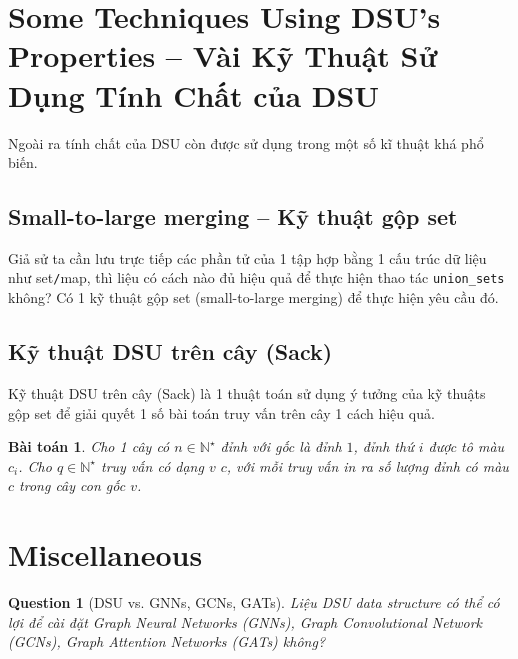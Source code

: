 \documentclass{article}
\newtheorem{baitoan}{Bài toán}
\newtheorem{question}{Question}
\begin{document}

\section{Some Techniques Using DSU's Properties -- Vài Kỹ Thuật Sử Dụng Tính Chất của DSU}
Ngoài ra tính chất của DSU còn được sử dụng trong một số kĩ thuật khá phổ biến.


\subsection{Small-to-large merging -- Kỹ thuật gộp set}
Giả sử ta cần lưu trực tiếp các phần tử của 1 tập hợp bằng 1 cấu trúc dữ liệu như set{\tt/}map, thì liệu có cách nào đủ hiệu quả để thực hiện thao tác \verb|union_sets| không? Có 1 kỹ thuật gộp set (small-to-large merging) để thực hiện yêu cầu đó.


\subsection{Kỹ thuật DSU trên cây (Sack)}
Kỹ thuật DSU trên cây (Sack) là 1 thuật toán sử dụng ý tưởng của kỹ thuậts gộp set để  giải quyết 1 số bài toán truy vấn trên cây 1 cách hiệu quả.

\begin{baitoan}
    Cho 1 cây có $n\in\mathbb{N}^\star$ đỉnh với gốc là đỉnh $1$, đỉnh thứ $i$ được tô màu $c_i$. Cho $q\in\mathbb{N}^\star$ truy vấn có dạng $v$ $c$, với mỗi truy vấn in ra số lượng đỉnh có màu $c$ trong cây con gốc $v$.
\end{baitoan}


\section{Miscellaneous}

\begin{question}[DSU vs. GNNs, GCNs, GATs]
    Liệu DSU data structure có thể có lợi để cài đặt Graph Neural Networks (GNNs), Graph Convolutional Network (GCNs), Graph Attention Networks (GATs) không?
\end{question}


\printbibliography[heading=bibintoc]
\end{document}
